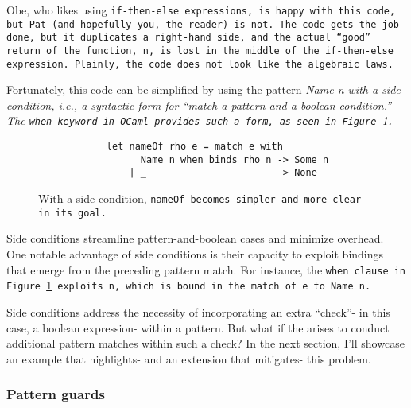 \documentclass[manuscript,screen,review, 12pt]{acmart}
\begin{document}
    Obe, who likes using \tt{if-then-else} expressions, is happy with this code,
    but Pat (and hopefully you, the reader) is not. The code gets the job done,
    but it duplicates a right-hand side, and the actual “good” return of the
    function, \tt{n}, is lost in the middle of the \tt{if-then-else} expression.
    Plainly, the code does not look like the algebraic laws. 
    
    Fortunately, this code can be simplified by using the pattern \it{Name n}
    with a \it{side condition}, i.e., a syntactic form for “match a pattern
    \it{and} a boolean condition.” The \tt{when} keyword in OCaml
    provides such a form, as seen in Figure~\ref{fig:whennameof}.
        
        \begin{figure}[ht]
            \begin{verbatim}
            let nameOf rho e = match e with     
                  Name n when binds rho n -> Some n
                | _                       -> None  
                \end{verbatim}
            \caption{With a side condition, \tt{nameOf} becomes simpler and more
            clear in its goal.}
            \label{fig:whennameof}
        \end{figure}

        
    
    
    

    Side conditions streamline pattern-and-boolean cases and minimize overhead.
    One notable advantage of side conditions is their capacity to exploit
    bindings that emerge from the preceding pattern match. For instance, the
    \tt{when} clause in Figure~\ref{fig:whennameof} exploits \tt{n}, which is
    bound in the match of \tt{e} to \tt{Name n}.

    Side conditions address the necessity of incorporating an extra “check”- in
    this case, a boolean expression- within a pattern. But what if the 
    arises to conduct additional pattern matches within such a check? In the
    next section, I'll showcase an example that highlights- and an extension
    that mitigates- this problem. 
    
    \subsubsection{Pattern guards}
    \label{guards}
    
\end{document}

